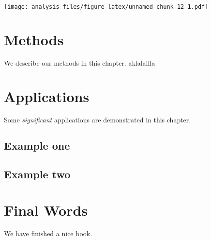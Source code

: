 \documentclass[
]{book}
\begin{document}
\texttt{[image: analysis\_files/figure-latex/unnamed-chunk-12-1.pdf]}

\hypertarget{methods}{%
\chapter{Methods}\label{methods}}

We describe our methods in this chapter.
aklalallla

\hypertarget{applications}{%
\chapter{Applications}\label{applications}}

Some \emph{significant} applications are demonstrated in this chapter.

\hypertarget{example-one}{%
\section{Example one}\label{example-one}}

\hypertarget{example-two}{%
\section{Example two}\label{example-two}}

\hypertarget{final-words}{%
\chapter{Final Words}\label{final-words}}

We have finished a nice book.

  
\end{document}
